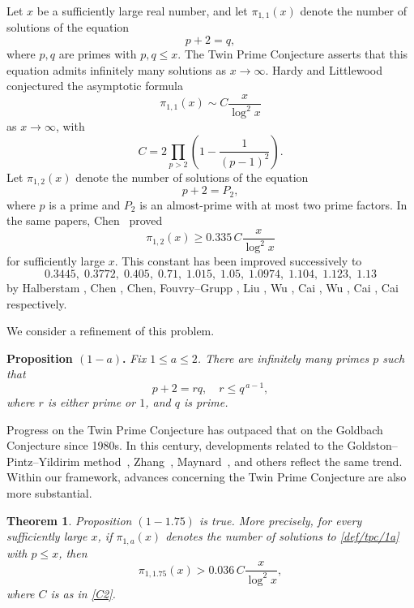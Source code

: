 \documentclass[12pt, a4paper]{amsart}
\def\leq{\leqslant}
\def\le{\leqslant}
\def\ge{\geqslant}
\theoremstyle{plain}
\newtheorem{theorem}{Theorem}[section]
\theoremstyle{remark}
\numberwithin{equation}{section}
\begin{document}
Let \( x \) be a sufficiently large real number, and let \( \pi_{1,1}(x) \) denote the number of solutions of the equation  
\[
p + 2 = q,
\]  
where \( p, q \) are primes with \( p, q \le x \).  
The Twin Prime Conjecture asserts that this equation admits infinitely many solutions as \( x \to \infty \).  
Hardy and Littlewood~\cite{HL23} conjectured the asymptotic formula  
\begin{equation}\label{pi11}
\pi_{1,1}(x) \sim C \frac{x}{\log^2 x}
\end{equation}  
as \(x \to \infty\), with  
\begin{equation}\label{C2}
C = 2 \prod_{p>2} \left( 1 - \frac{1}{(p-1)^2} \right).
\end{equation}
Let \( \pi_{1,2}(x) \) denote the number of solutions of the equation  
\[
p + 2 = P_2,
\]  
where \( p \) is a prime and \( P_2 \) is an almost-prime with at most two prime factors.  
In the same papers, Chen~\cite{Chen66, Chen73} proved  
\begin{equation}\label{pi12}
\pi_{1,2}(x) \ge 0.335 \, C \frac{x}{\log^2 x} 
\end{equation}  
for sufficiently large $x$. This constant has been improved successively to  
\[
0.3445,\; 0.3772,\; 0.405,\; 0.71,\; 1.015,\; 1.05,\; 1.0974,\; 1.104,\; 1.123,\; 1.13
\]  
by Halberstam \cite{Hal75}, Chen \cite{Chen78II}, Chen\cite{Chen78}, 
Fouvry--Grupp \cite{FG86}, Liu \cite{Liu89}, Wu \cite{Wu90}, Cai \cite{Cai02}, Wu \cite{Wu04}, 
Cai \cite{Cai08a},  Cai \cite{Cai08b} respectively.

We consider a refinement of this problem. 

\medskip

\noindent
{\bf Proposition $(1-a)$.}   
{\it Fix $1 \le a \le 2$.  
There are infinitely many primes \( p \) such that  
\begin{equation}\label{def/tpc/1a}
p + 2 = r q, \quad r \le q^{\,a-1},
\end{equation}
where \( r \) is either prime or \( 1 \), and \( q \) is prime. }  

\medskip

Progress on the Twin Prime Conjecture has outpaced that on the Goldbach Conjecture since 1980s.  
In this century, developments related to the Goldston--Pintz--Yildirim method~\cite{GPY1,GPY2}, Zhang~\cite{Zhang14}, 
Maynard~\cite{Maynard15}, and others reflect the same trend.  
Within our framework, advances concerning the Twin Prime Conjecture are also more substantial.

\begin{theorem}\label{Twin1}
Proposition \((1-1.75)\) is true.  
More precisely, for every sufficiently large $x$, if $\pi_{1,a}(x)$ denotes the number 
of solutions to \eqref{def/tpc/1a} with $p\leq x$, 
then
\[
\pi_{1,1.75}(x) > 0.036 \, C \frac{x}{\log^2 x},
\]  
where \( C \) is as in \eqref{C2}.
\end{theorem}
\end{document}
